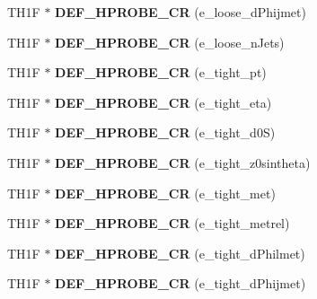 \begin{DoxyCompactItemize}
\item 
\hypertarget{classHistos__Fake_aecae87b46bc928d290318b6b3bf54fe0}{
TH1F $\ast$ {\bfseries DEF\_\-HPROBE\_\-CR} (e\_\-loose\_\-dPhijmet)}
\label{classHistos__Fake_aecae87b46bc928d290318b6b3bf54fe0}

\item 
\hypertarget{classHistos__Fake_a0ba1ef9cdb2c27749aaa61dea7d4dc94}{
TH1F $\ast$ {\bfseries DEF\_\-HPROBE\_\-CR} (e\_\-loose\_\-nJets)}
\label{classHistos__Fake_a0ba1ef9cdb2c27749aaa61dea7d4dc94}

\item 
\hypertarget{classHistos__Fake_a9a2aba54d05e6ede4450ccfdd4b906f0}{
TH1F $\ast$ {\bfseries DEF\_\-HPROBE\_\-CR} (e\_\-tight\_\-pt)}
\label{classHistos__Fake_a9a2aba54d05e6ede4450ccfdd4b906f0}

\item 
\hypertarget{classHistos__Fake_ad3bbcc0d1b2dfdbf0058b7ca8a07830f}{
TH1F $\ast$ {\bfseries DEF\_\-HPROBE\_\-CR} (e\_\-tight\_\-eta)}
\label{classHistos__Fake_ad3bbcc0d1b2dfdbf0058b7ca8a07830f}

\item 
\hypertarget{classHistos__Fake_a8d612360979a07461b63a400f0f8073c}{
TH1F $\ast$ {\bfseries DEF\_\-HPROBE\_\-CR} (e\_\-tight\_\-d0S)}
\label{classHistos__Fake_a8d612360979a07461b63a400f0f8073c}

\item 
\hypertarget{classHistos__Fake_a4e5ef094a431f85e68b07fd970200b3a}{
TH1F $\ast$ {\bfseries DEF\_\-HPROBE\_\-CR} (e\_\-tight\_\-z0sintheta)}
\label{classHistos__Fake_a4e5ef094a431f85e68b07fd970200b3a}

\item 
\hypertarget{classHistos__Fake_adcfd883901f532f023cff61186d765ff}{
TH1F $\ast$ {\bfseries DEF\_\-HPROBE\_\-CR} (e\_\-tight\_\-met)}
\label{classHistos__Fake_adcfd883901f532f023cff61186d765ff}

\item 
\hypertarget{classHistos__Fake_a69a58100e188a8aa2af2c3caac7a2513}{
TH1F $\ast$ {\bfseries DEF\_\-HPROBE\_\-CR} (e\_\-tight\_\-metrel)}
\label{classHistos__Fake_a69a58100e188a8aa2af2c3caac7a2513}

\item 
\hypertarget{classHistos__Fake_a395ffcced9ca4dfe57ed3fbd309bbe97}{
TH1F $\ast$ {\bfseries DEF\_\-HPROBE\_\-CR} (e\_\-tight\_\-dPhilmet)}
\label{classHistos__Fake_a395ffcced9ca4dfe57ed3fbd309bbe97}

\item 
\hypertarget{classHistos__Fake_a319d26e0c8d13afd1cf44f21a254d41d}{
TH1F $\ast$ {\bfseries DEF\_\-HPROBE\_\-CR} (e\_\-tight\_\-dPhijmet)}
\label{classHistos__Fake_a319d26e0c8d13afd1cf44f21a254d41d}


\end{DoxyCompactItemize}
